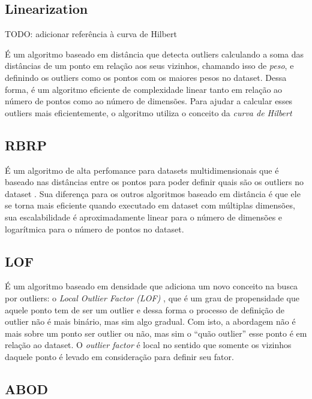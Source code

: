 \subsection{Linearization}

TODO: adicionar referência à curva de Hilbert 

É um algoritmo baseado em distância \cite{10.1007/3-540-45681-3_2} que detecta outliers calculando a soma das distâncias de um ponto em relação aos seus vizinhos, chamando isso de \textit{peso}, e definindo os outliers como os pontos com os maiores pesos no dataset. Dessa forma, é um algoritmo eficiente de complexidade linear tanto em relação ao número de pontos como ao número de dimensões. Para ajudar a calcular esses outliers mais eficientemente, o algoritmo utiliza o conceito da \textit{curva de Hilbert}

\subsection{RBRP}

É um algoritmo de alta perfomance para datasets multidimensionais que é baseado nas distâncias entre os pontos para poder definir quais são os outliers no dataset \cite{Ghoting2006}. Sua diferença para os outros algoritmos baseado em distância é que ele se torna mais eficiente quando executado em dataset com múltiplas dimensões, sua escalabilidade é aproximadamente linear para o número de dimensões e logarítmica para o número de pontos no dataset.

\subsection{LOF}

É um algoritmo baseado em densidade que adiciona um novo conceito na busca por outliers: o \textit{Local Outlier Factor (LOF)} \cite{Breunig:2000:LID:335191.335388}, que é um grau de propensidade que aquele ponto tem de ser um outlier e dessa forma o processo de definição de outlier não é mais binário, mas sim algo gradual. Com isto, a abordagem não é mais sobre um ponto ser outlier ou não, mas sim o ``quão outlier'' esse ponto é em relação ao dataset. O \textit{outlier factor} é local no sentido que somente os vizinhos daquele ponto é levado em consideração para definir seu fator.

\subsection{ABOD}

